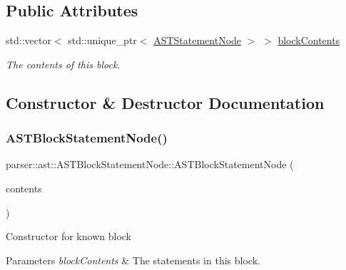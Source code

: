 \subsection*{Public Attributes}
\begin{DoxyCompactItemize}
\item 
std\+::vector$<$ std\+::unique\+\_\+ptr$<$ \hyperlink{classparser_1_1ast_1_1ASTStatementNode}{A\+S\+T\+Statement\+Node} $>$ $>$ \hyperlink{classparser_1_1ast_1_1ASTBlockStatementNode_abbd8aa518677035cba32a20a4d7135ac}{block\+Contents}
\begin{DoxyCompactList}\small\item\em The contents of this block. \end{DoxyCompactList}\end{DoxyCompactItemize}


\subsection{Constructor \& Destructor Documentation}
\mbox{\label{classparser_1_1ast_1_1ASTBlockStatementNode_a69b3e477b9945bb1567560f2951c9bcd}} 
\subsubsection{\texorpdfstring{A\+S\+T\+Block\+Statement\+Node()}{ASTBlockStatementNode()}}
{\footnotesize\ttfamily parser\+::ast\+::\+A\+S\+T\+Block\+Statement\+Node\+::\+A\+S\+T\+Block\+Statement\+Node (\begin{DoxyParamCaption}\item[{std\+::vector$<$ std\+::unique\+\_\+ptr$<$ \hyperlink{classparser_1_1ast_1_1ASTStatementNode}{A\+S\+T\+Statement\+Node} $>$$>$ \&}]{contents }\end{DoxyParamCaption})}

Constructor for known block 
\begin{DoxyParams}{Parameters}
{\em block\+Contents} & The statements in this block. \\
\hline
\end{DoxyParams}


